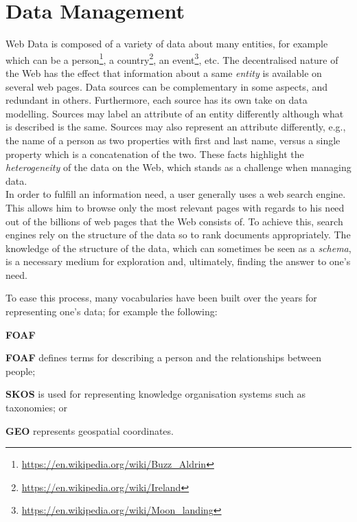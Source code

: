\section{Data Management}
\label{chap1:introduction:data-mgmt}

Web Data is composed of a variety of data about many entities, for example which can be a person\footnote{\url{https://en.wikipedia.org/wiki/Buzz_Aldrin}}, a country\footnote{\url{https://en.wikipedia.org/wiki/Ireland}}, an event\footnote{\url{https://en.wikipedia.org/wiki/Moon_landing}}, etc.
The decentralised nature of the Web has the effect that information about a same \emph{entity} is available on several web pages. Data sources can be complementary in some aspects, and redundant in others. Furthermore, each source has its own take on data modelling. Sources may label an attribute of an entity differently although what is described is the same. Sources may also represent an attribute differently, e.g., the name of a person as two properties with first and last name, versus a single property which is a concatenation of the two. These facts highlight the \emph{heterogeneity} of the data on the Web, which stands as a challenge when managing data.\\

In order to fulfill an information need, a user generally uses a web search engine. This allows him to browse only the most relevant pages with regards to his need out of the billions of web pages that the Web consists of. To achieve this, search engines rely on the structure of the data so to rank documents appropriately. The knowledge of the structure of the data, which can sometimes be seen as a \emph{schema}, is a necessary medium for exploration and, ultimately, finding the answer to one's need.

To ease this process, many vocabularies have been built over the years for representing one's data; for example the following:
\begin{labeling}{\textbf{FOAF}}
	\item[\textbf{FOAF}\protect\footnotemark] defines terms for describing a person and the relationships between people;
	\item[\textbf{SKOS}\protect\footnotemark] is used for representing knowledge organisation systems such as taxonomies; or
	\item[\textbf{GEO}\protect\footnotemark] represents geospatial coordinates.
\end{labeling}

